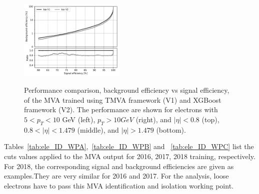 \begin{figure}[!htb]
\begin{center}
      \includegraphics[width=0.45\textwidth]{Figures/Electrons/2018_EE_10_.pdf} \\
   \caption{Performance comparison, background efficiency vs signal efficiency, of the MVA trained using TMVA framework (V1) and XGBoost framework (V2). The
   performance are shown for electrons with $5 < p_T < 10$ GeV (left), $p_T > 10 GeV$ (right), and $|\eta|<0.8$ (top), $0.8 < |\eta| < 1.479$ (middle), and
   $|\eta| > 1.479$ (bottom).
\label{fig:ele_ID_ISO_ROC_V1_vs_V2}}
\end{center}
\end{figure}




Tables~\ref{tab:ele_ID_WPA},~\ref{tab:ele_ID_WPB} and ~\ref{tab:ele_ID_WPC} list the cuts values applied to the MVA output for 2016, 2017, 2018 training, respectively. For 2018, the corresponding signal and background efficiencies are given as examples.They are very similar for 2016 and 2017. 
For the analysis, loose electrons have to pass this MVA identification and isolation working point.

